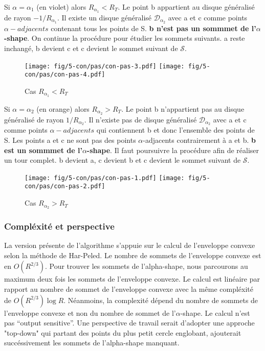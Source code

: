 Si $\alpha = \alpha_{1}$ (en violet) alors \textbf{$R_{\alpha_{1}} < R_T$}. Le point b appartient au disque généralisé de rayon $-1/R_{\alpha_{1}}$. Il existe un disque généralisé $\mathcal{D}_{\alpha_2}$ avec a et c comme points $\alpha-adjacents$ contenant tous les points de S. \textbf{b n'est pas un sommmet de l'$\alpha$-shape}. On continue la procédure pour étudier les sommets suivants. a reste inchangé, b devient c et c devient le sommet suivant de $\mathcal{S}$.

\begin{figure}[H]
  \centering
  \texttt{[image: fig/5-con/pas/con-pas-3.pdf]}
  \texttt{[image: fig/5-con/pas/con-pas-4.pdf]}
  \caption{Cas $R_{\alpha_{1}} < R_T$}
\end{figure}

Si $\alpha = \alpha_{2}$ (en orange) alors \textbf{$R_{\alpha_{2}} > R_T$}. Le point b n'appartient pas au disque généralisé de rayon $1/R_{\alpha_{2}}$. Il n'existe pas de disque généralisé $\mathcal{D}_{\alpha_2}$ avec a et c comme points $\alpha-adjacents$ qui contiennent b et donc l'ensemble des points de S. Les points a et c ne sont pas des points $\alpha$-adjacents contrairement à a et b. \textbf{b est un sommmet de l'$\alpha$-shape}. Il faut poursuivre la procédure afin de réaliser un tour complet. b devient a, c devient b et c devient le sommet suivant de $\mathcal{S}$.\\

\begin{figure}[H]
  \centering
  \texttt{[image: fig/5-con/pas/con-pas-1.pdf]}
  \texttt{[image: fig/5-con/pas/con-pas-2.pdf]}
  \caption{Cas $R_{\alpha_{2}} > R_T$}
\end{figure}

\subsubsection{Compléxité et perspective}

La version présente de l'algorithme s'appuie sur le calcul de l'enveloppe convexe selon la méthode de Har-Peled. Le nombre de sommets de l'enveloppe convexe est en $O(R^{2/3})$. Pour trouver les sommets de l'alpha-shape, nous parcourons au maximum deux fois les sommets de l'enveloppe convexe. Le calcul est linéaire par rapport au nombre de sommet de l'enveloppe convexe avec la même compléxité de $O(R^{2/3}) \log R$. Néanmoins, la complexité dépend du nombre de sommets de l'enveloppe convexe et non du nombre de sommet de l'$\alpha$-shape. Le calcul n'est pas ``output sensitive''. Une perspective de travail serait d'adopter une approche "top-down" qui partant des points du plus petit cercle englobant, ajouterait succéssivement les sommets de l'alpha-shape manquant. 
